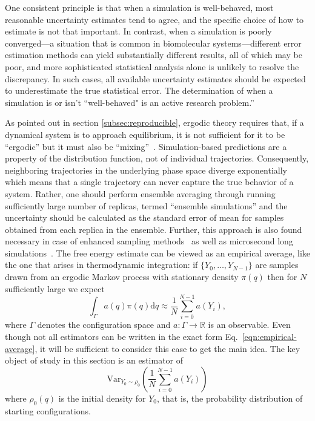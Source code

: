 One consistent principle is that when a simulation is well-behaved, most reasonable uncertainty estimates tend to agree, and the specific choice of how to estimate is not that important.  In contrast, when a simulation is poorly converged---a situation that is common in biomolecular systems---different error estimation methods can yield substantially different results, all of which may be poor, and more sophisticated statistical analysis alone is unlikely to resolve the discrepancy. In such cases, all available uncertainty estimates should be expected to underestimate the true statistical error. The determination of when a simulation is or isn't ``well-behaved" is an active research problem.'' %

As pointed out in section \ref{subsec:reproducible}, ergodic theory requires that, if a dynamical system is to approach equilibrium, it is not sufficient for it to be ``ergodic'' but it must also be ``mixing''~\cite{coveney2016, mdbook2025}. Simulation-based predictions are a property of the distribution function, not of individual trajectories. Consequently, neighboring trajectories in the underlying phase space diverge exponentially which means that a single trajectory can never capture the true behavior of a system. Rather, one should perform ensemble averaging through running sufficiently large number of replicas, termed ``ensemble simulations'' and the uncertainty should be calculated as the standard error of mean for samples obtained from each replica in the ensemble. Further, this approach is also found necessary in case of enhanced sampling methods~\cite{bhati2018} as well as microsecond long simulations~\cite{bhati2023}.
The free energy estimate can be viewed as an empirical average, like the one that arises in thermodynamic integration: if $\{Y_0, \dots, Y_{N-1}\}$ are samples drawn from an ergodic Markov process with stationary density $\pi(q)$ then for $N$ sufficiently large we expect
\begin{equation}
    \int_\Gamma a(q) \pi(q) \mathrm{d}q\approx \frac{1}{N}\sum_{i=0}^{N-1} a(Y_i), \label{eqn:empirical-average}
\end{equation}
where $\Gamma$ denotes the configuration space and $a : \Gamma \rightarrow \mathbb{R}$ is an observable. Even though not all estimators can be written in the exact form Eq.~\ref{eqn:empirical-average}, it will be sufficient to consider this case to get the main idea. The key object of study in this section is an estimator of
\begin{equation}
    \mathrm{Var}_{Y_0 \sim \rho_0}\left(\frac{1}{N}\sum_{i=0}^{N-1} a(Y_i)\right)
\end{equation}
where $\rho_0(q)$ is the initial density for $Y_0$, that is, the probability distribution of starting configurations.

